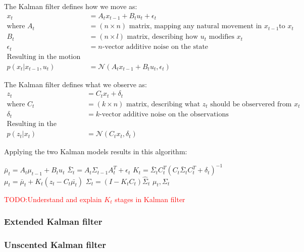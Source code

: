 \documentclass{article}
\makeatletter
\newcommand{\todo}[1]{\textcolor{red}{TODO:\@ #1}}
\makeatother
\begin{document}
The Kalman filter defines how we move as:
\begin{align*}
  x_t &= A_t x_{t-1} + B_t u_t + \epsilon_t \\
  \text{where }
  A_t &= \text{$(n \times n)$ matrix, mapping any natural movement in $x_{t-1}$
    to $x_t$} \\
  B_t &= \text{$(n \times l)$ matrix, describing how $u_t$ modifies $x_t$} \\
  \epsilon_t &= \text{$n$-vector additive noise on the state} \\
  \text{Resulting in the motion model:} \\
  p(x_t \vert x_{t-1}, u_t) &= \mathcal{N}(A_t x_{t-1} + B_t u_t, \epsilon_t)
\end{align*}

The Kalman filter defines what we observe as:
\begin{align*}
  z_t &= C_t x_t + \delta_t \\
  \text{where }
  C_t &= \text{$(k \times n)$ matrix, describing what $z_t$ should be
    observered from $x_t$} \\
  \delta_t &= \text{$k$-vector additive noise on the observations} \\
  \text{Resulting in the observation model:} \\
  p(z_t \vert x_t) &= \mathcal{N}(C_t x_t, \delta_t)
\end{align*}

Applying the two Kalman models results in this algorithm:
\begin{algorithmic}[1]
    \State$\bar{\mu}_t = A_t \mu_{t-1} + B_t u_t$
    \State$\bar{\Sigma}_t = A_t \Sigma_{t-1}A_t^T + \epsilon_t$
    \State$K_t =
      \bar{\Sigma}_t C_t^T{(C_t \bar{\Sigma}_t C_t^T + \delta_t)}^{-1}$
    \State$\mu_t = \bar{\mu}_t + K_t(z_t - C_t \bar{\mu_t})$
    \State$\Sigma_t = (I - K_t C_t)\hat{\Sigma}_t$
    \State\Return$\mu_t, \Sigma_t$
  \EndProcedure{}
\end{algorithmic}

\todo{Understand and explain $K_t$ stages in Kalman filter}

\subsubsection{Extended Kalman filter}

\subsubsection{Unscented Kalman filter}
\end{document}
